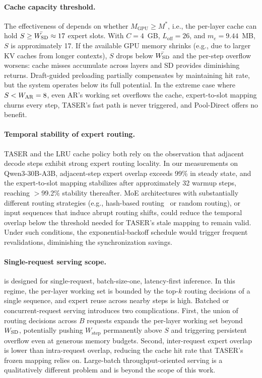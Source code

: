 \paragraph{Cache capacity threshold.}
The effectiveness of \sysname depends on whether $M_{\mathrm{GPU}} \ge M^*$, i.e., the per-layer cache can hold $S \ge \bar{W_{\mathrm{SD}}} \approx 17$ expert slots. With $C = 4$~GB, $L_{\mathrm{off}} = 26$, and $m_e = 9.44$~MB, $S$ is approximately 17. If the available GPU memory shrinks (e.g., due to larger KV caches from longer contexts), $S$ drops below $\bar{W_{\mathrm{SD}}}$ and the per-step overflow worsens: cache misses accumulate across layers and SD provides diminishing returns. Draft-guided preloading partially compensates by maintaining hit rate, but the system operates below its full potential. In the extreme case where $S < W_{\mathrm{AR}} = 8$, even AR's working set overflows the cache, expert-to-slot mapping churns every step, TASER's fast path is never triggered, and Pool-Direct offers no benefit.

\paragraph{Temporal stability of expert routing.}
TASER and the LRU cache policy both rely on the observation that adjacent decode steps exhibit strong expert routing locality. In our measurements on Qwen3-30B-A3B, adjacent-step expert overlap exceeds 99\% in steady state, and the expert-to-slot mapping stabilizes after approximately 32 warmup steps, reaching $>$99.2\% stability thereafter. MoE architectures with substantially different routing strategies (e.g., hash-based routing~\cite{roller2021hash} or random routing), or input sequences that induce abrupt routing shifts, could reduce the temporal overlap below the threshold needed for TASER's stale mapping to remain valid. Under such conditions, the exponential-backoff schedule would trigger frequent revalidations, diminishing the synchronization savings.

\paragraph{Single-request serving scope.}
\sysname is designed for single-request, batch-size-one, latency-first inference. In this regime, the per-layer working set is bounded by the top-$k$ routing decisions of a single sequence, and expert reuse across nearby steps is high. Batched or concurrent-request serving introduces two complications. First, the union of routing decisions across $B$ requests expands the per-layer working set beyond $W_{\mathrm{SD}}$, potentially pushing $W_{\mathrm{step}}$ permanently above $S$ and triggering persistent overflow even at generous memory budgets. Second, inter-request expert overlap is lower than intra-request overlap, reducing the cache hit rate that TASER's frozen mapping relies on. Large-batch throughput-oriented serving is a qualitatively different problem and is beyond the scope of this work.

